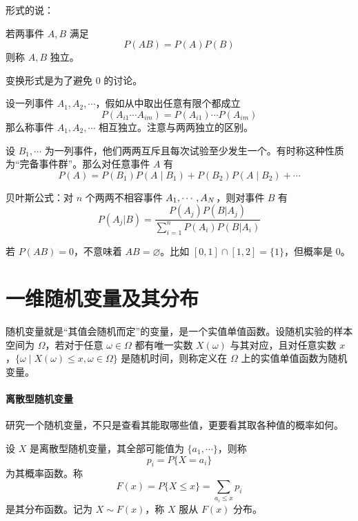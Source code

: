 形式的说：

\begin{definition}[条件概率]
	若两事件 $A, B$ 满足
	\[ P(A B) = P(A) P(B) \]
	则称 $A, B$ 独立。
\end{definition}

变换形式是为了避免 $0$ 的讨论。

设一列事件 $A_1, A_2, \cdots$，假如从中取出任意有限个都成立
\[ P(A_{i1} \cdots A_{im}) = P(A_{i1}) \cdots P(A_{im}) \]
那么称事件 $A_1, A_2, \cdots$ 相互独立。注意与两两独立的区别。


\begin{theorem}[全概率公式]
	设 $B_1, \cdots$ 为一列事件，他们两两互斥且每次试验至少发生一个。有时称这种性质为“完备事件群”。那么对任意事件 $A$ 有
	\[ P(A) = P(B_1)P(A \mid B_1) + P(B_2)P(A \mid B_2) + \cdots \]
\end{theorem}


\begin{theorem}[全概率公式]
	贝叶斯公式：对 $n$ 个两两不相容事件 $A_1,\cdots,A_N$，则对事件 $B$ 有
	\[ P\left(A_j | B\right) = \frac{P(A_j)P(B | A_j)}{\sum\limits_{i=1}^n P(A_i)P(B | A_i) } \]
\end{theorem}

\begin{note}
	若 $P(AB) = 0$，不意味着 $AB = \varnothing$。比如 $[0,1]\cap [1,2] = \{1\}$，但概率是 $0$。
\end{note}

\section{一维随机变量及其分布}

随机变量就是“其值会随机而定”的变量，是一个实值单值函数。设随机实验的样本空间为 $\Omega$，若对于任意 $\omega \in \Omega$ 都有唯一实数 $X(\omega)$ 与其对应，且对任意实数 $x$，$\{\omega \mid X(\omega) \leqslant x, \omega \in \Omega\}$ 是随机时间，则称定义在 $\Omega$ 上的实值单值函数为随机变量。

\paragraph{离散型随机变量}

研究一个随机变量，不只是查看其能取哪些值，更要看其取各种值的概率如何。

\begin{definition}
	设 $X$ 是离散型随机变量，其全部可能值为 $\{a_1, \cdots\}$，则称
	\[ p_i = P\{X = a_i\} \]
	为其概率函数。称
	\[ F(x) = P\{X \leqslant x\} = \sum_{a_i \leqslant x} p_i \]
	是其分布函数。记为 $X \sim F(x)$，称 $X$ 服从 $F(x)$ 分布。
\end{definition}

